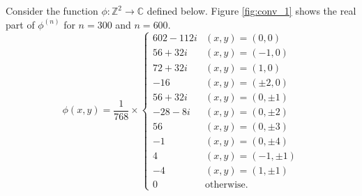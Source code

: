 \documentclass[11pt, letter]{book}
\newenvironment{example}
  {\pushQED{\qed}\renewcommand{\qedsymbol}{$\triangle$}\examplex}
  {\popQED\endexamplex}
\newcommand{\f}[2]{\frac{#1}{#2}}
\begin{document}
\begin{example}\label{exp:firstExample}\normalfont
Consider the function $\phi : \mathbb{Z}^2 \to \mathbb{C}$ defined below. Figure \ref{fig:conv_1} shows the real part of $\phi^{(n)}$ for $n=300$ and $n=600$. 
\begin{equation*}
    \phi(x,y) = 
    \f{1}{768}\times
    \begin{cases}
    602 - 112i &(x,y) = (0,0)\\
    56 + 32i   &(x,y) = (-1,0)\\
    72 + 32i   &(x,y) = (1,0)\\
    -16        &(x,y) = (\pm 2,0)\\
    56 + 32i   &(x,y) = (0,\pm 1)\\
    -28 - 8i   &(x,y) = (0,\pm 2)\\
    56         &(x,y) = (0,\pm 3)\\
    -1         &(x,y) = (0,\pm 4)\\
    4          &(x,y) = (-1,\pm 1)\\
    -4         &(x,y) = (1,\pm 1)\\
    0          &\text{otherwise}.
    \end{cases}
\end{equation*}



\end{example}
\end{document}
